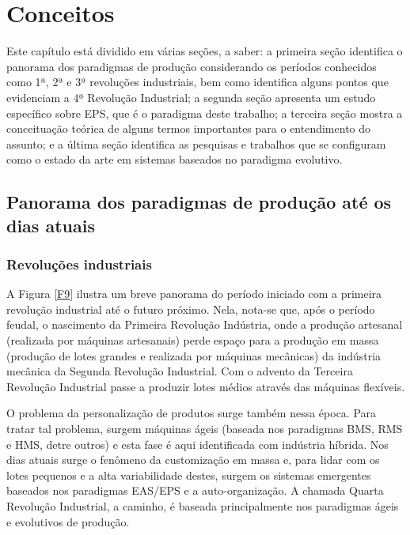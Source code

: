 \chapter{Conceitos}
\label{cap:conceitos}

Este capítulo está dividido em várias seções, a saber: a primeira seção identifica o panorama dos paradigmas de produção considerando os períodos conhecidos como 1ª, 2ª e 3ª revoluções industriais, bem como identifica alguns pontos que evidenciam a 4ª Revolução Industrial; a segunda seção apresenta um estudo específico sobre EPS, que é o paradigma deste trabalho; a terceira seção mostra a conceituação teórica de alguns termos importantes para o entendimento do assunto; e a última seção identifica as pesquisas e trabalhos que se configuram como o estado da arte em sistemas baseados no paradigma evolutivo.




\section{Panorama dos paradigmas de produção até os dias atuais}	

\subsection{Revoluções industriais}

A Figura \ref{F9} ilustra um breve panorama do período iniciado com a primeira revolução industrial até o futuro próximo. Nela, nota-se que, após o período feudal, o nascimento da Primeira Revolução Indústria, onde a produção artesanal (realizada por máquinas artesanais) perde espaço para a produção em massa (produção de lotes grandes e realizada por máquinas mecânicas) da indústria mecânica da Segunda Revolução Industrial. Com o advento da Terceira Revolução Industrial passe a produzir lotes médios através das máquinas flexíveis. 

O problema da personalização de produtos surge também nessa época. Para tratar tal problema, surgem máquinas ágeis (baseada nos paradigmas BMS, RMS e HMS, detre outros) e esta fase é aqui identificada com indústria híbrida. Nos dias atuais surge o fenômeno da customização em massa e, para lidar com os lotes pequenos e a alta variabilidade destes, surgem os sistemas emergentes baseados nos paradigmas EAS/EPS e a auto-organização. A chamada Quarta Revolução Industrial, a caminho, é baseada principalmente nos paradigmas ágeis e evolutivos de produção. 

